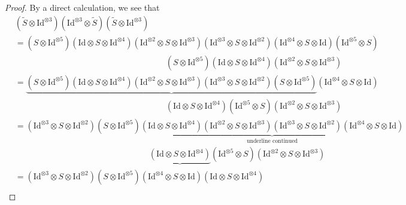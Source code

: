 \documentclass[a4paper,reqno,10pt]{amsart}
\theoremstyle{plain}
\theoremstyle{definition}
\theoremstyle{remark}
\begin{document}
\begin{proof}
By a direct calculation, we see that
    \begin{align*}
        &(\widetilde{S} \otimes \mathrm{Id}^{\otimes 3})  (\mathrm{Id}^{\otimes 3} \otimes \widetilde{S}) (\widetilde{S} \otimes \mathrm{Id}^{\otimes 3}) \\
       & = ( S \otimes \mathrm{Id}^{\otimes 5}) (\mathrm{Id} \otimes S \otimes \mathrm{Id}^{\otimes 4}) (\mathrm{Id}^{\otimes 2} \otimes S \otimes \mathrm{Id}^{\otimes 3})     
(\mathrm{Id}^{\otimes 3} \otimes S \otimes \mathrm{Id}^{\otimes 2}) (\mathrm{Id}^{\otimes 4} \otimes S \otimes \mathrm{Id}) (\mathrm{Id}^{\otimes 5} \otimes S) \\ 
& \qquad \qquad \qquad \qquad \qquad \qquad \qquad \qquad \qquad ( S \otimes \mathrm{Id}^{\otimes 5}) (\mathrm{Id} \otimes S \otimes \mathrm{Id}^{\otimes 4}) (\mathrm{Id}^{\otimes 2} \otimes S \otimes \mathrm{Id}^{\otimes 3})  \\
&= \underbrace{( S \otimes \mathrm{Id}^{\otimes 5}) (\mathrm{Id} \otimes S \otimes \mathrm{Id}^{\otimes 4}) (\mathrm{Id}^{\otimes 2} \otimes S \otimes \mathrm{Id}^{\otimes 3})     
(\mathrm{Id}^{\otimes 3} \otimes S \otimes \mathrm{Id}^{\otimes 2})  ( S \otimes \mathrm{Id}^{\otimes 5}) } (\mathrm{Id}^{\otimes 4} \otimes S \otimes \mathrm{Id}) \\
& \qquad \qquad \qquad \qquad \qquad \qquad \qquad \qquad \qquad  (\mathrm{Id} \otimes S \otimes \mathrm{Id}^{\otimes 4}) (\mathrm{Id}^{\otimes 5} \otimes S) (\mathrm{Id}^{\otimes 2} \otimes S \otimes \mathrm{Id}^{\otimes 3}) 
\end{align*}
\begin{align*}
&= (\mathrm{Id}^{\otimes 3} \otimes S \otimes \mathrm{Id}^{\otimes 2}) ( S \otimes \mathrm{Id}^{\otimes 5}) \underbrace{(\mathrm{Id} \otimes S \otimes \mathrm{Id}^{\otimes 4}) (\mathrm{Id}^{\otimes 2} \otimes S \otimes \mathrm{Id}^{\otimes 3}) (\mathrm{Id}^{\otimes 3} \otimes S \otimes \mathrm{Id}^{\otimes 2}) (\mathrm{Id}^{\otimes 4} \otimes S \otimes \mathrm{Id}) }_{\text{underline continued}} \\
& \qquad \qquad \qquad \qquad \qquad \qquad \qquad \qquad \underbrace{(\mathrm{Id} \otimes S \otimes \mathrm{Id}^{\otimes 4}) } (\mathrm{Id}^{\otimes 5} \otimes S) (\mathrm{Id}^{\otimes 2} \otimes S \otimes \mathrm{Id}^{\otimes 3}) \\
&= (\mathrm{Id}^{\otimes 3} \otimes S \otimes \mathrm{Id}^{\otimes 2}) ( S \otimes \mathrm{Id}^{\otimes 5}) (\mathrm{Id}^{\otimes 4} \otimes S \otimes \mathrm{Id}) (\mathrm{Id} \otimes S \otimes \mathrm{Id}^{\otimes 4}) \\

\end{align*}
\end{proof}
\end{document}
